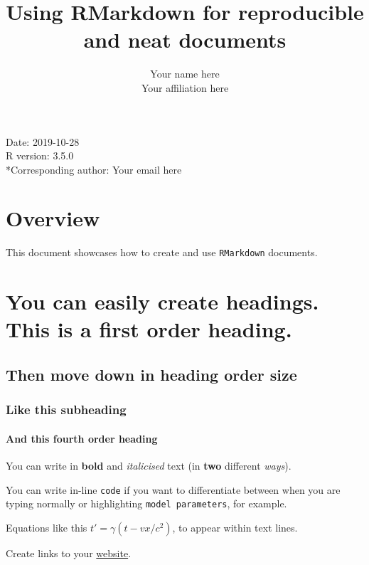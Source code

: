 \documentclass[article]{article}
\title{Using RMarkdown for reproducible and neat documents}
\author{Your name here\\
Your affiliation here}
\date{}
\let\oldparagraph\paragraph
\renewcommand{\paragraph}[1]{\oldparagraph{#1}\mbox{}}
\begin{document}
\maketitle

{
\hypersetup{linkcolor=black}
\setcounter{tocdepth}{4}
\tableofcontents
}
\newpage   

Date: 2019-10-28\\
R version: 3.5.0\\
*Corresponding author: Your email here

\newpage

\section{Overview}\label{overview}

This document showcases how to create and use \texttt{RMarkdown}
documents.

\section{You can easily create headings. This is a first order
heading.}\label{you-can-easily-create-headings.-this-is-a-first-order-heading.}

\subsection{Then move down in heading order
size}\label{then-move-down-in-heading-order-size}

\subsubsection{Like this subheading}\label{like-this-subheading}

\paragraph{And this fourth order
heading}\label{and-this-fourth-order-heading}

You can write in \textbf{bold} and \emph{italicised} text (in
\textbf{two} different \emph{ways}).

You can write in-line \texttt{code} if you want to differentiate between
when you are typing normally or highlighting \texttt{model\ parameters},
for example.

Equations like this \(t' = \gamma(t - vx/c^{2})\), to appear within text
lines.

Create links to your \href{https://github.com/darwinanddavis}{website}.
\end{document}
